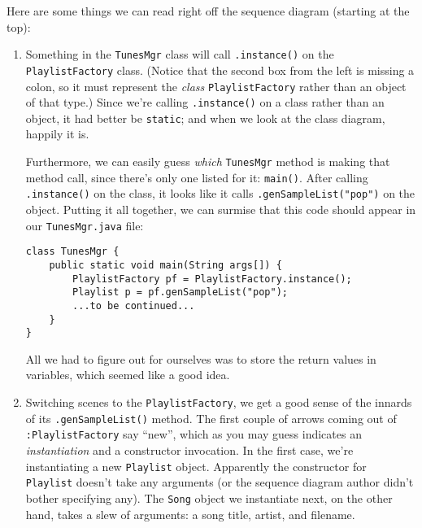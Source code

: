 Here are some things we can read right off the sequence diagram (starting at
the top):

\begin{enumerate}
\itemsep.1em

\item Something in the \texttt{TunesMgr} class will call \texttt{.instance()}
on the \texttt{PlaylistFactory} class. (Notice that the second box from the
left is missing a colon, so it must represent the \textit{class}
\texttt{PlaylistFactory} rather than an object of that type.) Since we're
calling \texttt{.instance()} on a class rather than an object, it had better
be \texttt{static}; and when we look at the class diagram, happily it is.

Furthermore, we can easily guess \textit{which} \texttt{TunesMgr} method is
making that method call, since there's only one listed for it:
\texttt{main()}. After calling \texttt{.instance()} on the class, it looks
like it calls \texttt{.genSampleList("pop")} on the object. Putting it all
together, we can surmise that this code should appear in our
\texttt{TunesMgr.java} file:

\begin{Verbatim}[fontsize=\footnotesize,samepage=true,frame=single]
class TunesMgr {
    public static void main(String args[]) {
        PlaylistFactory pf = PlaylistFactory.instance();
        Playlist p = pf.genSampleList("pop");
        ...to be continued...
    }
}
\end{Verbatim}

All we had to figure out for ourselves was to store the return values in
variables, which seemed like a good idea.

\item Switching scenes to the \texttt{PlaylistFactory}, we get a good sense of
the innards of its \texttt{.genSampleList()} method. The first couple of
arrows coming out of \texttt{:PlaylistFactory} say ``new'', which as you may
guess indicates an \textit{instantiation} and a constructor invocation. In
the first case, we're instantiating a new \texttt{Playlist} object. Apparently
the constructor for \texttt{Playlist} doesn't take any arguments (or the
sequence diagram author didn't bother specifying any). The \texttt{Song}
object we instantiate next, on the other hand, takes a slew of arguments: a
song title, artist, and filename.


\end{enumerate}
